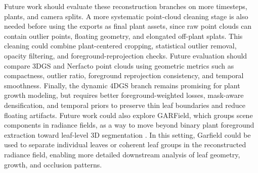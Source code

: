 \documentclass[sigconf]{acmart}
\begin{document}
Future work should evaluate these reconstruction branches on more timesteps, plants, and camera splits. A more systematic point-cloud cleaning stage is also needed before using the exports as final plant assets, since raw point clouds can contain outlier points, floating geometry, and elongated off-plant splats. This cleaning could combine plant-centered cropping, statistical outlier removal, opacity filtering, and foreground-reprojection checks. Future evaluation should compare 3DGS and Nerfacto point clouds using geometric metrics such as compactness, outlier ratio, foreground reprojection consistency, and temporal smoothness. Finally, the dynamic 4DGS branch remains promising for plant growth modeling, but requires better foreground-weighted losses, mask-aware densification, and temporal priors to preserve thin leaf boundaries and reduce floating artifacts. Future work could also explore GARField, which groups scene components in radiance fields, as a way to move beyond binary plant foreground extraction toward leaf-level 3D segmentation \cite{kim2024garfield}. In this setting, Garfield could be used to separate individual leaves or coherent leaf groups in the reconstructed radiance field, enabling more detailed downstream analysis of leaf geometry, growth, and occlusion patterns.





\end{document}
